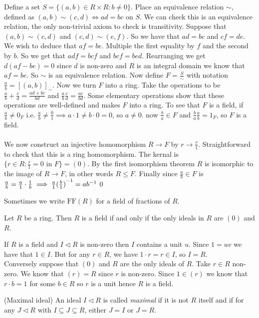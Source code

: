 \documentclass{article}
\newcommand{\nrm}{\triangleleft}
\begin{document}
\begin{itemize}
\pf Define a set $ S=\{(a,b)\in R\times R:b\ne 0\} $. Place an equivalence relation $ \sim $, defined as $ (a,b)\sim (c,d)\iff ad=bc $ on $ S $. We can check this is an equivalence relation, the only non-trivial axiom to check is transitivity. Suppose that $ (a,b)\sim (c,d) $ and $ (c,d)\sim (e,f) $. So we have that $ ad=bc $ and $ cf=de $. We wish to deduce that $ af=be $. Multiple the first equality by $ f $ and the second by $ b $. So we get that $ adf=bcf $ and $ bcf=bed $. Rearranging we get $ d(af-be)=0 $ since $ d $ is non-zero and $ R $ is an integral domain we know that $ af=be $. So $ \sim $ is an equivalence relation. Now define $ F=\frac S\sim $ with notation $ \frac ab = [(a,b)]_\sim $. Now we turn $ F $ into a ring. Take the operations to be $ \frac ab + \frac cd = \frac {ad+bc}{bd} $ and $ \frac ab\frac cd = \frac{ac}{bd} $. Some elementary operations show that these operations are well-defined and makes $ F $ into a ring. To see that $ F $ is a field, if $ \frac ab\ne 0_F $ i.e. $ \frac ab\ne \frac 01\implies a\cdot 1\ne b\cdot 0 =0  $, so $ a\ne 0 $. now $ \frac ba \in F $ and $ \frac ba\frac ab=1_F $, so $ F $ is a field.\\\\
We now construct an injective homomorphism $ R\to F $ by $ r\to \frac r1 $. Straightforward to check that this is a ring homomorphism. The kernal is $ \{r\in R: \frac r1 = 0 \text { in } F\} =(0)$. By the first isomorphism theorem $ R $ is isomorphic to the image of $ R\to F $, in other words $ R\le F $.
Finally since $ \frac ab\in F $ is $ \frac ab= \frac a1\cdot \frac 1b\implies \frac a1{(\frac b1)}^{-1}=a{b}^{-1} $\qed

Sometimes we write $ \mathrm{FF}(R) $ for a field of fractions of $ R $.
\begin{proposition}
  Let $ R $ be a ring. Then $ R $ is a field if and only if the only ideals in $ R $ are $ (0) $ and $ R $.
\end{proposition}
\pf If $ R $ is a field and $ I\nrm R $ is non-zero then $ I $ contains a unit $ u $. Since $ 1=uv $ we have that $ 1\in I $. But for any $ r\in R $, we have $ 1\cdot r =r\in I $, so $ I=R $.\\
Conversely suppose that $ (0) $ and $ R $ are the only ideals of $ R $. Take $ r\in R $ non-zero. We know that $ (r)=R $ since $ r $ is non-zero. Since $ 1\in (r) $ we know that $ r\cdot b = 1 $ for some $ b\in R $ so $ r $ is a unit hence $ R $ is a field.

\begin{definition}
	(Maximal ideal) An ideal $ I\nrm R $ is called \textit{maximal} if it is not $ R $ itself and if for any $ J\nrm R $ with $ I\subseteq J\subseteq R $, either $ J=I $ or $ J=R $.
\end{definition}


\end{itemize}
\end{document}
